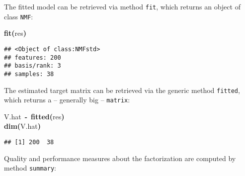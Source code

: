 \documentclass[a4paper]{article}\usepackage{graphicx, color}
\makeatletter
\newcommand{\hlfunctioncall}[1]{\textcolor[rgb]{0.501960784313725,0,0.329411764705882}{\textbf{#1}}}%
\newcommand{\hlkeyword}[1]{\textcolor[rgb]{0,0,0}{\textbf{#1}}}%
\newcommand{\hlassignement}[1]{\textcolor[rgb]{0,0,0}{\textbf{#1}}}%
\newcommand{\hlsymbol}[1]{\textcolor[rgb]{0,0,0}{#1}}%
\newcommand{\hlstd}[1]{\textcolor[rgb]{0,0,0}{#1}}%
\newenvironment{kframe}{%
 \def\FrameCommand##1{\hskip\@totalleftmargin \hskip-\fboxsep
 \colorbox{shadecolor}{##1}\hskip-\fboxsep
     \hskip-\linewidth \hskip-\@totalleftmargin \hskip\columnwidth}%
 \MakeFramed {\advance\hsize-\width
   \@totalleftmargin\z@ \linewidth\hsize
   \@setminipage}}%
 {\par\unskip\endMakeFramed}
\newenvironment{knitrout}{}{} %
\let\code=\texttt
\makeatother
\begin{document}
The fitted model can be retrieved via method \code{fit}, which returns an object of class \code{NMF}:

\begin{knitrout}
\color{fgcolor}\begin{kframe}
\begin{flushleft}
\ttfamily\noindent
\hlfunctioncall{fit}\hlkeyword{(}\hlsymbol{res}\hlkeyword{)}\mbox{}
\normalfont
\end{flushleft}
\begin{verbatim}
## <Object of class:NMFstd>
## features: 200 
## basis/rank: 3 
## samples: 38 
\end{verbatim}
\end{kframe}
\end{knitrout}


The estimated target matrix can be retrieved via the generic method \code{fitted}, which returns a -- generally big -- \code{matrix}:

\begin{knitrout}
\color{fgcolor}\begin{kframe}
\begin{flushleft}
\ttfamily\noindent
\hlsymbol{V.hat}{\ }\hlassignement{\usebox{\hlnormalsizeboxlessthan}-}{\ }\hlfunctioncall{fitted}\hlkeyword{(}\hlsymbol{res}\hlkeyword{)}\hspace*{\fill}\\
\hlstd{}\hlfunctioncall{dim}\hlkeyword{(}\hlsymbol{V.hat}\hlkeyword{)}\mbox{}
\normalfont
\end{flushleft}
\begin{verbatim}
## [1] 200  38
\end{verbatim}
\end{kframe}
\end{knitrout}


Quality and performance measures about the factorization are computed by method \code{summary}:
\end{document}
